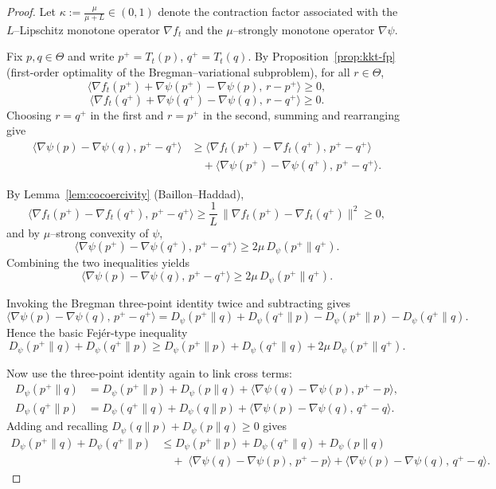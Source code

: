 \documentclass[11pt]{article}
\theoremstyle{plain}
\theoremstyle{definition}
\theoremstyle{remark}
\begin{document}
\begin{proof}
Let $\kappa := \frac{\mu}{\mu+L}\in(0,1)$ denote the contraction factor associated with the
$L$–Lipschitz monotone operator $\nabla f_t$ and the $\mu$–strongly monotone operator $\nabla\psi$.

Fix $p,q\in\Theta$ and write $p^+=T_t(p)$, $q^+=T_t(q)$. By Proposition~\ref{prop:kkt-fp}
(first-order optimality of the Bregman–variational subproblem), for all $r\in\Theta$,
\begin{equation}\tag*{}
\langle\nabla f_t(p^+)+\nabla\psi(p^+)-\nabla\psi(p),\,r-p^+\rangle\ge0,
\end{equation}
\begin{equation}\tag*{}
\langle\nabla f_t(q^+)+\nabla\psi(q^+)-\nabla\psi(q),\,r-q^+\rangle\ge0.
\end{equation}
Choosing $r=q^+$ in the first and $r=p^+$ in the second, summing and rearranging give
\begin{equation}\tag*{}
\begin{aligned}
\langle\nabla\psi(p)-\nabla\psi(q),\,p^+-q^+\rangle
&\ge
\langle\nabla f_t(p^+)-\nabla f_t(q^+),\,p^+-q^+\rangle\\
&\quad+\langle\nabla\psi(p^+)-\nabla\psi(q^+),\,p^+-q^+\rangle .
\end{aligned}
\end{equation}

By Lemma~\ref{lem:cocoercivity} (Baillon–Haddad),
\[
\langle\nabla f_t(p^+)-\nabla f_t(q^+),\,p^+-q^+\rangle
\ge\frac{1}{L}\,\|\nabla f_t(p^+)-\nabla f_t(q^+)\|^2\ge0,
\]
and by $\mu$–strong convexity of $\psi$,
\[
\langle\nabla\psi(p^+)-\nabla\psi(q^+),\,p^+-q^+\rangle 
\ge 2\mu\,D_\psi(p^+\|q^+).
\]
Combining the two inequalities yields
\[
\langle\nabla\psi(p)-\nabla\psi(q),\,p^+-q^+\rangle
\ge 2\mu\,D_\psi(p^+\|q^+).
\]

Invoking the Bregman three-point identity twice and subtracting gives
\[
\langle\nabla\psi(p)-\nabla\psi(q),\,p^+-q^+\rangle
= D_\psi(p^+\|q)+D_\psi(q^+\|p)
 - D_\psi(p^+\|p)-D_\psi(q^+\|q).
\]
Hence the basic Fejér-type inequality
\begin{equation}\label{eq:key-Fejer}
D_\psi(p^+\|q)+D_\psi(q^+\|p)
\ge
D_\psi(p^+\|p)+D_\psi(q^+\|q)+2\mu\,D_\psi(p^+\|q^+).
\end{equation}

Now use the three-point identity again to link cross terms:
\begin{align}\tag*{}
D_\psi(p^+\|q) &= D_\psi(p^+\|p)+D_\psi(p\|q)
 + \langle\nabla\psi(q)-\nabla\psi(p),\,p^+-p\rangle,\\
D_\psi(q^+\|p) &= D_\psi(q^+\|q)+D_\psi(q\|p)
 + \langle\nabla\psi(p)-\nabla\psi(q),\,q^+-q\rangle.
\end{align}
Adding and recalling $D_\psi(q\|p)+D_\psi(p\|q)\ge0$ gives
\begin{equation}\label{eq:sum-cross}
\begin{aligned}
D_\psi(p^+\|q)+D_\psi(q^+\|p)
&\le D_\psi(p^+\|p)+D_\psi(q^+\|q)+D_\psi(p\|q)\\
&\quad+\;\langle\nabla\psi(q)-\nabla\psi(p),\,p^+-p\rangle
+\langle\nabla\psi(p)-\nabla\psi(q),\,q^+-q\rangle .
\end{aligned}
\end{equation}


\end{proof}
\end{document}
